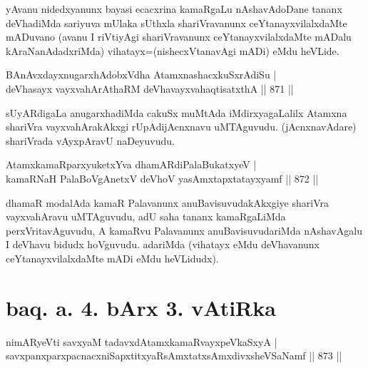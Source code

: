 \begin{artha}
yAvanu nidedxyanunx bayasi ecacxrina kamaRgaLu nAshavAdoDane tananx deVhadiMda sariyuva mUlaka sUthxla shariVravanunx ceYtanayxvilalxdaMte mADuvano (avanu I riVtiyAgi shariVravanunx ceYtanayxvilalxdaMte mADalu kAraNanAdadxriMda) vihatayx=(nishecxVtanavAgi mADi) eMdu heVLide.
\end{artha}


\begin{shl}
BAnAvxdayxnugarxhAdobxVdha AtamxnashacxkuSxrAdiSu | \\
deVhasayx vayxvahArAthaRM deVhavayxvahaqtisatxthA \hfill||  871 ||  
\end{shl}

\begin{artha}
sUyARdigaLa anugarxhadiMda cakuSx muMtAda iMdirxyagaLalilx Atamxna shariVra vayxvahArakAkxgi rUpAdijAcnxnavu uMTAguvudu. (jAcnxnavAdare) shariVrada vAyxpAravU naDeyuvudu.
\end{artha}


\begin{shl}
AtamxkamaRparxyuketxYva dhamARdiPalaBukatxyeV | \\
kamaRNaH PalaBoVgAnetxV deVhoV yasAmxtapxtatayxyamf \hfill||  872 ||  
\end{shl}

\begin{artha}
dhamaR modalAda kamaR Palavanunx anuBavisuvudakAkxgiye shariVra vayxvahAravu uMTAguvudu, adU saha tananx kamaRgaLiMda perxVritavAguvudu, A kamaRvu Palavanunx anuBavisuvudariMda nAshavAgalu I deVhavu bidudx hoVguvudu. adariMda (vihatayx eMdu deVhavanunx ceYtanayxvilalxdaMte mADi eMdu heVLidudx).
\end{artha}

\section*{baq. a. 4. bArx 3. vAtiRka}


\begin{shl}
nimARyeVti savxyaM tadavxdAtamxkamaRvayxpeVkaSxyA | \\
savxpanxparxpacnacxniSapxtitxyaRsAmxtatxsAmxdivxsheVSaNamf \hfill||  873 ||  
\end{shl}


